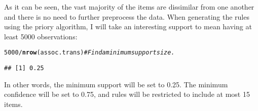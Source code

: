 \documentclass{article}\usepackage[]{graphicx}\usepackage[]{color}
\makeatletter
\newcommand{\hlnum}[1]{\textcolor[rgb]{0.686,0.059,0.569}{#1}}%
\newcommand{\hlcom}[1]{\textcolor[rgb]{0.678,0.584,0.686}{\textit{#1}}}%
\newcommand{\hlopt}[1]{\textcolor[rgb]{0,0,0}{#1}}%
\newcommand{\hlstd}[1]{\textcolor[rgb]{0.345,0.345,0.345}{#1}}%
\newcommand{\hlkwd}[1]{\textcolor[rgb]{0.737,0.353,0.396}{\textbf{#1}}}%
\newenvironment{kframe}{%
 \def\at@end@of@kframe{}%
 \ifinner\ifhmode%
  \def\at@end@of@kframe{\end{minipage}}%
  \begin{minipage}{\columnwidth}%
 \fi\fi%
 \def\FrameCommand##1{\hskip\@totalleftmargin \hskip-\fboxsep
 \colorbox{shadecolor}{##1}\hskip-\fboxsep
     \hskip-\linewidth \hskip-\@totalleftmargin \hskip\columnwidth}%
 \MakeFramed {\advance\hsize-\width
   \@totalleftmargin\z@ \linewidth\hsize
   \@setminipage}}%
 {\par\unskip\endMakeFramed%
 \at@end@of@kframe}
\newenvironment{knitrout}{}{} %
\makeatother
\begin{document}
As it can be seen, the vast majority of the items are dissimilar from one
another and there is no need to further preprocess the data.  When generating
the rules using the priory algorithm, I will take an interesting support to mean
having at least \num{5000} observations:

\begin{knitrout}
\color{fgcolor}\begin{kframe}
\begin{alltt}
\hlnum{5000} \hlopt{/} \hlkwd{nrow}\hlstd{(assoc.trans)}  \hlcom{# Find a minimum support size.}
\end{alltt}
\begin{verbatim}
## [1] 0.25
\end{verbatim}
\end{kframe}
\end{knitrout}

In other words, the minimum support will be set to \num{0.25}.  The minimum
confidence will be set to \num{0.75}, and rules will be restricted to include at
most \num{15} items.
\end{document}

